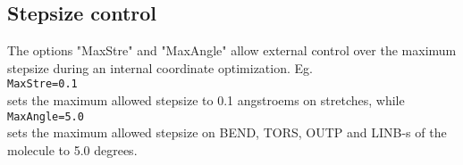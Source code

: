 \documentclass[prl,aps,preprint,superbib,12pt]{revtex4}
\begin{document}
\subsection{Stepsize control}
The options "MaxStre" and "MaxAngle" allow external control over the maximum
stepsize during an internal coordinate optimization.
Eg.
\\
{\tt MaxStre=0.1} 
\\
sets the maximum allowed stepsize to 0.1 angstroems on stretches,
while
\\
{\tt MaxAngle=5.0}
\\
sets the maximum allowed stepsize on BEND, TORS, OUTP and LINB-s of the 
molecule to 5.0 degrees.
\end{document}
